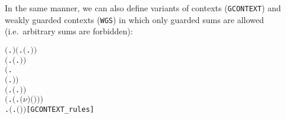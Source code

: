 In the same manner, we can also define variants of contexts (\texttt{GCONTEXT}) and weakly guarded
contexts (\texttt{WGS}) in which only guarded sums are allowed (i.e.~arbitrary sums are forbidden):
\begin{alltt}
\HOLTokenTurnstile{}  \ensuremath{(}\HOLTokenLambda{}. \ensuremath{)} \HOLSymConst{\HOLTokenConj{}} \ensuremath{(}\HOLSymConst{\HOLTokenForall{}}.  \ensuremath{(}\HOLTokenLambda{}. \ensuremath{)}\ensuremath{)} \HOLSymConst{\HOLTokenConj{}}
   \ensuremath{(}\HOLSymConst{\HOLTokenForall{}} .   \HOLSymConst{\HOLTokenImp{}}  \ensuremath{(}\HOLTokenLambda{}. \HOLSymConst{\ensuremath{\ldotp}} \ensuremath{)}\ensuremath{)} \HOLSymConst{\HOLTokenConj{}}
   \ensuremath{(}\HOLSymConst{\HOLTokenForall{}}   .
          \HOLSymConst{\HOLTokenConj{}}   \HOLSymConst{\HOLTokenImp{}}  \ensuremath{(}\HOLTokenLambda{}. \HOLSymConst{\ensuremath{\ldotp}}  \HOLSymConst{\ensuremath{+}} \HOLSymConst{\ensuremath{\ldotp}} \ensuremath{)}\ensuremath{)} \HOLSymConst{\HOLTokenConj{}}
   \ensuremath{(}\HOLSymConst{\HOLTokenForall{}} .   \HOLSymConst{\HOLTokenConj{}}   \HOLSymConst{\HOLTokenImp{}}  \ensuremath{(}\HOLTokenLambda{}.   \HOLSymConst{\ensuremath{\mid}}  \ensuremath{)}\ensuremath{)} \HOLSymConst{\HOLTokenConj{}}
   \ensuremath{(}\HOLSymConst{\HOLTokenForall{}} .   \HOLSymConst{\HOLTokenImp{}}  \ensuremath{(}\HOLTokenLambda{}. \ensuremath{(\nu}\ensuremath{)} \ensuremath{(} \ensuremath{)}\ensuremath{)}\ensuremath{)} \HOLSymConst{\HOLTokenConj{}}
   \HOLSymConst{\HOLTokenForall{}} .   \HOLSymConst{\HOLTokenImp{}}  \ensuremath{(}\HOLTokenLambda{}.  \ensuremath{(} \ensuremath{)} \ensuremath{)}\hfill{[GCONTEXT_rules]}
\end{alltt}
